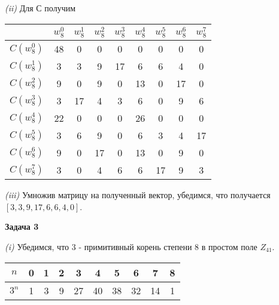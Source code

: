 \documentclass[10pt]{article}
\begin{document}
\smallskip

{\it (ii)}
Для С получим

\smallskip

\noindent
\begin{tabularx}{\textwidth}{|C|C|C|C|C|C|C|C|C|}
  \hline
  & $w^0_8$ & $w^1_8$ & $w^2_8$ & $w^3_8$ & $w^4_8$ & $w^5_8$ & $w^6_8$ & $w^7_8$ \\
  \hline
  $C(w_8^0)$ & 48 & 0 & 0 & 0 & 0 & 0 & 0 & 0\\
  \hline
  $C(w_8^1)$ & 3 & 3 & 9 & 17 & 6 & 6 & 4 & 0\\
  \hline
  $C(w_8^2)$ & 9 & 0 & 9 & 0 & 13 & 0 & 17 & 0\\
  \hline
  $C(w_8^3)$ & 3 & 17 & 4 & 3 & 6 & 0 & 9 & 6\\
  \hline
  $C(w_8^4)$ & 22 & 0 & 0 & 0 & 26 & 0 & 0 & 0\\
  \hline
  $C(w_8^5)$ & 3 & 6 & 9 & 0 & 6 & 3 & 4 & 17\\
  \hline
  $C(w_8^6)$ & 9 & 0 & 17 & 0 & 13 & 0 & 9 & 0\\
  \hline
  $C(w_8^7)$ & 3 & 0 & 4 & 6 & 6 & 17 & 9 & 3\\
  \hline
\end{tabularx}

\smallskip

{\it (iii)}
Умножив матрицу на полученный вектор, убедимся, что получается $[3, 3, 9, 17, 6, 6, 4, 0]$.

\medskip

{\bf Задача 3}

{\it (i)}
Убедимся, что $3$ - примитивный корень степени $8$ в простом поле $Z_{41}$.

\smallskip

\noindent
\begin{tabularx}{\textwidth}{|C|C|C|C|C|C|C|C|C|C|}
  \hline
  $n$ & 0 & 1 & 2 & 3 & 4 & 5 & 6 & 7 & 8 \\
  \hline
  $3^n$ & 1 & 3 & 9 & 27 & 40 & 38 & 32 & 14 & 1\\
  \hline
\end{tabularx}
\end{document}
